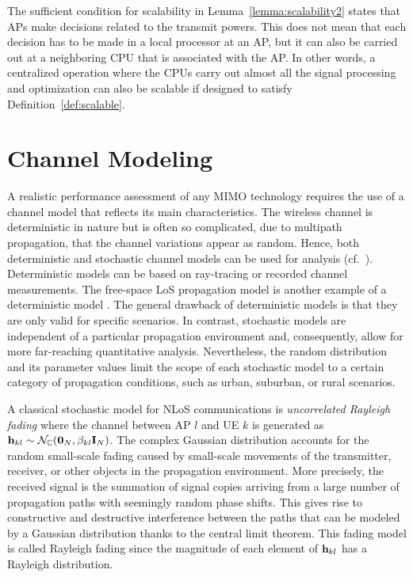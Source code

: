 \begin{remark}
The sufficient condition for scalability in Lemma~\ref{lemma:scalability2} states that APs make decisions related to the transmit powers. This does not mean that each decision has to be made in a local processor at an AP, but it can also be carried out at a neighboring CPU that is associated with the AP. In other words, a centralized operation where the CPUs carry out almost all the signal processing and optimization can also be scalable if designed to satisfy Definition~\ref{def:scalable}.
\end{remark}


 \vspace{-3mm}
 \section{Channel Modeling}
\label{sec:channel-modeling}  

A realistic performance assessment of any MIMO technology requires the use of a channel model that reflects its main characteristics. The wireless channel is deterministic in nature but is often so complicated, due to multipath propagation, that the channel variations appear as random. Hence, both deterministic and stochastic channel models can be used for analysis (cf.~\cite[Sec.~7.3]{massivemimobook}). Deterministic models can be based on ray-tracing or recorded channel measurements. The free-space \gls{LoS} propagation model is another example of a deterministic model \cite[Sec.~1.3.2]{massivemimobook}. The general drawback of deterministic models is that they are only valid for specific scenarios. In contrast, stochastic models are independent of a particular propagation environment and, consequently, allow for more far-reaching quantitative analysis. Nevertheless, the random distribution and its parameter values limit the scope of each stochastic model to a certain category of propagation conditions, such as urban, suburban, or rural scenarios.

\enlargethispage{-\baselineskip}

A classical stochastic model for \gls{NLoS} communications is \emph{uncorrelated Rayleigh fading} where the channel between \gls{AP} $l$ and \gls{UE} $k$ is generated as $\mathbf{h}_{kl} \sim \mathcal{N}_{\mathbb{C}}( \mathbf{0}_N, \beta_{kl}\mathbf{I}_N)$.
The complex Gaussian distribution accounts for the random small-scale fading caused by small-scale movements of the transmitter, receiver, or other objects in the propagation environment. More precisely, the received signal is the summation of signal copies arriving from a large number of propagation paths with seemingly random phase shifts. This gives rise to constructive and destructive interference between the paths that can be modeled by  a Gaussian distribution thanks to the central limit theorem. This fading model is called Rayleigh fading since the magnitude of each element of $\mathbf{h}_{kl}$ has a Rayleigh distribution.

